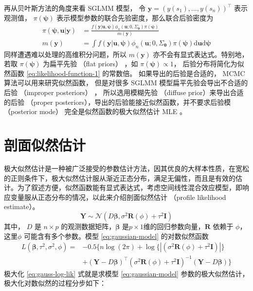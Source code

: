 \documentclass[12pt,a4paper,UTF8,twoside]{book}
\theoremstyle{definition}
\theoremstyle{definition}
\theoremstyle{definition}
\theoremstyle{remark}
\begin{document}
再从贝叶斯方法的角度来看 SGLMM 模型， 令
\(\mathbf{y} = (y(s_1),\ldots,y(s_n))^{\top}\) 表示观测值，
\(\pi(\boldsymbol{\psi})\)
表示模型参数的联合先验密度，那么联合后验密度为 \begin{equation}
\begin{aligned}
\pi(\boldsymbol{\psi},\mathbf{u}|\mathbf{y}) &= \frac{f(\mathbf{y|\mathbf{u}, \boldsymbol{\psi}})\phi_{n}(\mathbf{u};0,\Sigma_{\boldsymbol{\theta}})\pi(\boldsymbol{\psi})}{m(\mathbf{y})} \\
m(\mathbf{y}) &= \int f(\mathbf{y|\mathbf{u}, \boldsymbol{\psi}})\phi_{n}(\mathbf{u};0,\Sigma_{\boldsymbol{\theta}})\pi(\boldsymbol{\psi})\mathrm{d} \mathbf{u} \mathrm{d} \boldsymbol{\psi}
\end{aligned}
\end{equation} \noindent 同样遭遇难以处理的高维积分问题，所以
\(m(\mathbf{y})\) 亦不会有显式表达式。特别地，若取
\(\pi(\boldsymbol{\psi})\) 为扁平先验 （flat priors） ，如
\(\pi(\boldsymbol{\psi}) \propto 1\)， 后验分布将简化为似然函数
\eqref{eq:likelihood-function-1} 的常数倍。 如果导出的后验是合适的， MCMC
算法可以用来研究似然函数， 但是对很多 SGLMM
模型扁平先验会导出不合适的后验 （improper posteriors）
\citep{Natarajan1995}， 所以选用模糊先验 （diffuse
prior）来导出合适的后验 （proper
posteriors），导出的后验能接近似然函数，并不要求后验模 （posterior
mode） 完全是似然函数的极大似然估计 MLE \citep{Robert1996JASA}。

\hypertarget{sec:profile-likelihood}{%
\section{剖面似然估计}\label{sec:profile-likelihood}}

极大似然估计是一种被广泛接受的参数估计方法，因其优良的大样本性质，在宽松的正则条件下，极大似然估计服从渐近正态分布，满足无偏性，而且是有效的估计。为了叙述方便，似然函数能有显式表达式，考虑空间线性混合效应模型，即响应变量服从正态分布的情况，以此来介绍剖面似然估计
（profile likelihood estimate）\citep{Diggle2007}。 \begin{equation}
\mathbf{Y} \sim \mathcal{N}(D\boldsymbol{\beta},\sigma^2 \mathbf{R}(\phi) + \tau^2\mathbf{I})
\label{eq:gaussian-model}
\end{equation} \noindent 其中， \(D\) 是 \(n \times p\)
的观测数据矩阵，\(\boldsymbol{\beta}\)
是\(p\times 1\)维的回归参数向量，\(\mathbf{R}\) 依赖于
\(\phi\)，这里\(\phi\) 可能含有多个参数。模型 \eqref{eq:gaussian-model}
的对数似然函数 \begin{equation}
\begin{aligned}
L(\boldsymbol{\beta},\tau^2,\sigma^2,\phi) = {} 
 & - 0.5\{ n\log(2\pi) + \log\{|(\sigma^2\mathbf{R}(\phi)+\tau^2\mathbf{I})|\} \\
 & + (\mathbf{Y} - D\boldsymbol{\beta})^{\top}(\sigma^2\mathbf{R}(\phi)+\tau^2\mathbf{I})^{-1}(\mathbf{Y} - D\boldsymbol{\beta}) \}  
\end{aligned} \label{eq:gauss-log-lik}
\end{equation} \noindent 极大化 \eqref{eq:gauss-log-lik} 式就是求模型
\eqref{eq:gaussian-model}
参数的极大似然估计，极大化对数似然的过程分步如下：
\end{document}
